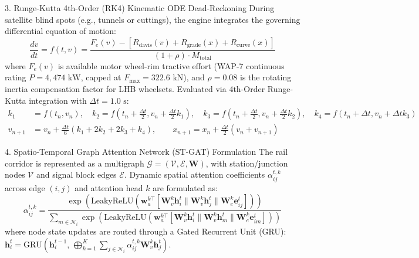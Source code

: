 \documentclass[10pt, a4paper]{article}
\begin{document}
\begin{mathbox}{3. Runge-Kutta 4th-Order (RK4) Kinematic ODE Dead-Reckoning}
  During satellite blind spots (e.g., tunnels or cuttings), the engine integrates the governing differential equation of motion:
  \begin{equation}
    \frac{dv}{dt} = f(t, v) = \frac{F_e(v) - \left[R_{\text{davis}}(v) + R_{\text{grade}}(x) + R_{\text{curve}}(x)\right]}{(1 + \rho) \cdot M_{\text{total}}}
  \end{equation}
  where $F_e(v)$ is available motor wheel-rim tractive effort (WAP-7 continuous rating $P = 4,474\text{ kW}$, capped at $F_{\text{max}} = 322.6\text{ kN}$), and $\rho = 0.08$ is the rotating inertia compensation factor for LHB wheelsets. Evaluated via 4th-Order Runge-Kutta integration with $\Delta t = 1.0\text{ s}$:
  \begin{align}
    k_1 &= f(t_n, v_n), \quad k_2 = f\left(t_n + \tfrac{\Delta t}{2}, v_n + \tfrac{\Delta t}{2} k_1\right), \quad k_3 = f\left(t_n + \tfrac{\Delta t}{2}, v_n + \tfrac{\Delta t}{2} k_2\right), \quad k_4 = f(t_n + \Delta t, v_n + \Delta t k_3) \\
    v_{n+1} &= v_n + \frac{\Delta t}{6}(k_1 + 2k_2 + 2k_3 + k_4), \qquad x_{n+1} = x_n + \frac{\Delta t}{2}(v_n + v_{n+1})
  \end{align}
\end{mathbox}

\begin{mathbox}{4. Spatio-Temporal Graph Attention Network (ST-GAT) Formulation}
  The rail corridor is represented as a multigraph $\mathcal{G} = (\mathcal{V}, \mathcal{E}, \mathbf{W})$, with station/junction nodes $\mathcal{V}$ and signal block edges $\mathcal{E}$. Dynamic spatial attention coefficients $\alpha_{ij}^{t, k}$ across edge $(i, j)$ and attention head $k$ are formulated as:
  \begin{equation}
    \alpha_{ij}^{t, k} = \frac{\exp\left(\text{LeakyReLU}\left(\mathbf{w}_a^{k\top} \left[\mathbf{W}_v^k \mathbf{h}_i^t \parallel \mathbf{W}_v^k \mathbf{h}_j^t \parallel \mathbf{W}_e^k \mathbf{e}_{ij}^t\right]\right)\right)}{\sum_{m \in \mathcal{N}_i} \exp\left(\text{LeakyReLU}\left(\mathbf{w}_a^{k\top} \left[\mathbf{W}_v^k \mathbf{h}_i^t \parallel \mathbf{W}_v^k \mathbf{h}_m^t \parallel \mathbf{W}_e^k \mathbf{e}_{im}^t\right]\right)\right)}
  \end{equation}
  where node state updates are routed through a Gated Recurrent Unit (GRU): $\mathbf{h}_i^{t} = \text{GRU}\left(\mathbf{h}_i^{t-1}, \, \bigoplus_{k=1}^{K} \sum_{j \in \mathcal{N}_i} \alpha_{ij}^{t, k} \mathbf{W}_v^k \mathbf{h}_j^t\right)$.
\end{mathbox}
\end{document}
